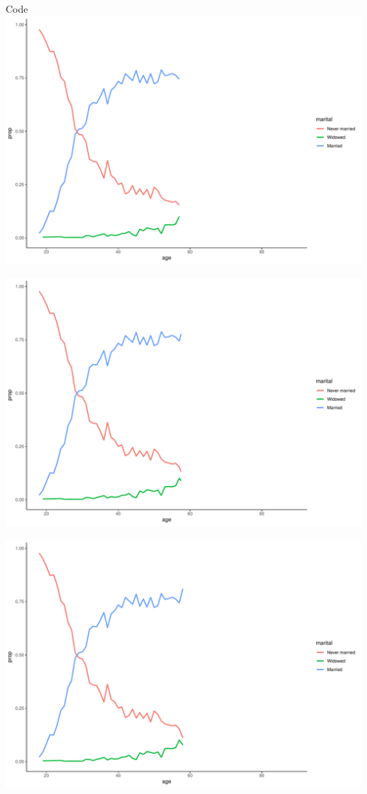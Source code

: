 \documentclass[
  ignorenonframetext,
]{beamer}
\begin{document}
\begin{frame}[fragile]{Code}
\includegraphics{gss_cat_files/figure-beamer/unnamed-chunk-1-59.pdf}

\includegraphics{gss_cat_files/figure-beamer/unnamed-chunk-1-60.pdf}

\includegraphics{gss_cat_files/figure-beamer/unnamed-chunk-1-61.pdf}


\end{frame}
\end{document}
